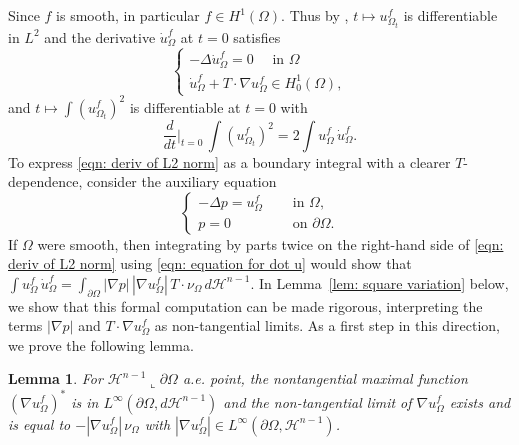 \documentclass[10pt, reqno]{amsart}
\numberwithin{equation}{section}
\newtheorem{lemma}[theorem]{Lemma}
\def\W{\Omega}
\def\na{\nabla}
\begin{document}
Since $f$ is smooth, in particular $f \in H^1(\W)$. Thus  by \cite[Theorem 5.3.1]{hp18}, 
$t \mapsto u_{\W_t}^f$ is differentiable in $L^2$ and the derivative  $\dot{u}_{\W}^f$ at $t=0$ satisfies
\begin{equation}
    \label{eqn: equation for dot u}
\begin{cases}
 -\Delta \dot{u}_{\W}^f =0 \quad \text{ in } \W \\
 \dot{u}_{\W}^f + T \cdot \nabla u_{\W}^f \in H_0^1(\W),
\end{cases}
\end{equation}
and   $t \mapsto \int ( u_{\Omega_t}^f)^2$ is differentiable at $t=0$ with
\begin{equation}\label{eqn: deriv of L2 norm}
\frac{d}{dt}\Big|_{t=0}\, \int \left(u_{\Omega_t}^f\right)^2 =2 \int  u_{\Omega}^f\,  \dot{u}_{\W}^f.
\end{equation}
To express \eqref{eqn: deriv of L2 norm} as a boundary integral with a clearer $T$-dependence,  consider the auxiliary equation 
\begin{equation} \label{e:aux}
 \begin{cases}
   -\Delta p = u_{\W}^f \quad &\text{ in } \W, \\
   p=0 \quad &\text{ on } \partial \W. 
 \end{cases}
\end{equation}
If $\W$ were smooth, then integrating by parts twice on the right-hand side of \eqref{eqn: deriv of L2 norm} using \eqref{eqn: equation for dot u} would show that $\int u_{\Omega}^f\,  \dot{u}_{\W}^f =  \int_{\partial \W} |\na p| \,| \nabla u_{\W}^f| \, T\cdot\nu_\W \,d \mathcal{H}^{n-1}$. In Lemma~\ref{lem: square variation} below, we show that this formal computation can be made rigorous, interpreting the terms $|\nabla p|$ and $T\cdot \nabla u_\W^f$ as non-tangential limits. As a first step in this direction, we prove the following lemma.
\begin{lemma} \label{l:NTlimits}
 For $\mathcal{H}^{n-1}\llcorner{\partial \W}$ a.e. point, the nontangential maximal function $(\na u_\W^f)^*$ is in $L^\infty(\partial \W, d\mathcal{H}^{n-1})$ and the non-tangential limit of $\nabla u_{\W}^f$ exists and is equal to $-|\na u_\W^f| \, \nu_\W$ with  $|\na u_\W^f| \in L^\infty(\partial\W, \mathcal{H}^{n-1})$.
\end{lemma}
\end{document}
